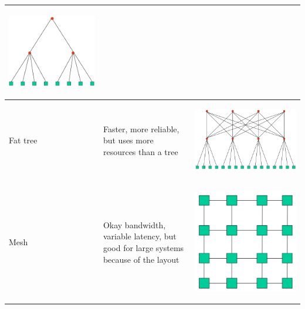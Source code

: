 \begin{center}
\begin{tabular}{| m{2cm} | m{5cm} | c |}
\begin{minipage}{.3\textwidth}
\begin{center}
        \includegraphics[width=0.5\linewidth]{images/tree}
      \end{center}
    \end{minipage} \\ \hline
    Fat tree & Faster, more reliable, but uses more resources than a tree & 
    \begin{minipage}{.3\textwidth}
      \begin{center}
        \includegraphics[width=0.5\linewidth]{images/fat-tree}
      \end{center}
    \end{minipage} \\ \hline
    Mesh & Okay bandwidth, variable latency, but good for large systems because
    of the layout & 
    \begin{minipage}{.3\textwidth}
      \begin{center}
        \includegraphics[width=0.5\linewidth]{images/mesh}
      \end{center}
    \end{minipage} \\ \hline
  \end{tabular}
\end{center}

